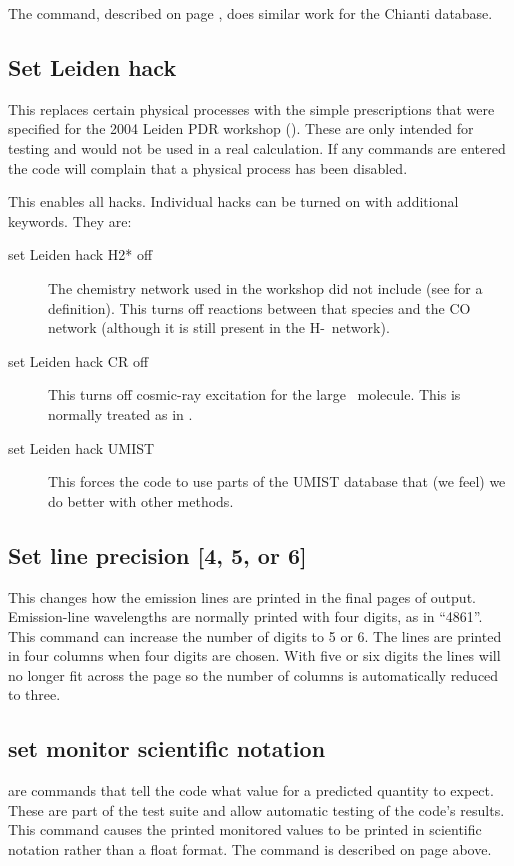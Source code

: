 The  command, described on page \pageref{sec:SetChianti},
does similar work for the Chianti database.

\subsection{Set Leiden hack}

This replaces certain physical processes with the simple prescriptions
that were specified for the 2004 Leiden PDR workshop
(\citealp{Roellig2007}).
These are only intended for testing and would not be used
in a real calculation.
If any  commands are entered the code will
complain that a physical process has been disabled.

This enables all hacks.
Individual hacks can be turned on with additional keywords.
They are:

\begin{description}
\item[set Leiden hack H2* off]  The chemistry network used in the workshop did
not include \htwo* (see \citealp{Tielens1985a} for a definition).  This
turns off reactions between that species and the CO network (although it
is still present in the H-\htwo\ network).

\item[set Leiden hack CR off]  This turns off cosmic-ray excitation for the
large \htwo\ molecule.
This is normally treated as in \citet{Dalgarno1999}.

\item[set Leiden hack UMIST]  This forces the code to use parts of the UMIST
database that (we feel) we do better with other methods.
\end{description}

\subsection{Set line precision [4, 5, or 6]}

This changes how the emission lines are printed in the final pages of
output.
Emission-line wavelengths are normally printed with four digits,
as in ``4861''.
This command can increase the number of digits to 5 or 6.
The lines are printed in four columns when four digits are chosen.
With five or six digits the lines will no longer fit across the page so
the number of columns is automatically reduced to three.

\subsection{set monitor scientific notation}
 are commands that
tell the code what value for a predicted quantity to expect.  These are
part of the test suite and allow automatic testing of the code's results.
This command causes the printed monitored values to be printed in scientific
notation rather than a float format.
The  command is described on page
\pageref{sec:CommandMonitor} above.

